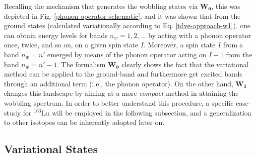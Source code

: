Recalling the mechanism that generates the wobbling states via $\mathbf{W_0}$, this was depicted in Fig. \ref{phonon-operator-schematic}, and it was shown that from the ground states (calculated variationally according to Eq. \ref{tdve-approach-w1}), one can obtain energy levels for bands $n_w=1, 2, \dots$ by acting with a phonon operator once, twice, and so on, on a given spin state $I$. Moreover, a spin state $I$ from a band $n_w=n'$ emerged by means of the phonon operator acting on $I-1$ from the band $n_w=n'-1$. The formalism $\mathbf{W_0}$ clearly shows the fact that the variational method can be applied to the ground-band and furthermore get excited bands through an additional term (i.e., the phonon operator). On the other hand, $\mathbf{W_1}$ changes this landscape by aiming at a more \emph{compact} method in attaining the wobbling spectrum. In order to better understand this procedure, a specific case-study for $^{163}$Lu will be employed in the following subsection, and a generalization to other isotopes can be inherently adopted later on.

\subsection{Variational States}
\label{subsection-variational-states}

